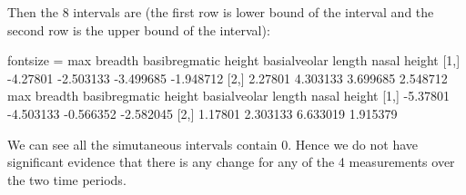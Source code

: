 \documentclass{article}
\begin{document}
\begin{enumerate}[leftmargin = 0 em, label = \arabic*., font = \bfseries]
\begin{enumerate}
  Then the 8 intervals are (the first row is lower bound of the interval and the second row is the upper bound of the interval):
 \begin{rcode*}{fontsize = \footnotesize}
     max breadth basibregmatic height basialveolar length nasal height
[1,]    -4.27801            -2.503133           -3.499685    -1.948712
[2,]     2.27801             4.303133            3.699685     2.548712
     max breadth basibregmatic height basialveolar length nasal height
[1,]    -5.37801            -4.503133           -0.566352    -2.582045
[2,]     1.17801             2.303133            6.633019     1.915379
 \end{rcode*}
 We can see all the simutaneous intervals contain 0. Hence we do not have significant evidence that there is any change for any of the 4 measurements over the two time periods.


\end{enumerate}


 	\end{enumerate}









	
	
	
	
\end{document}
